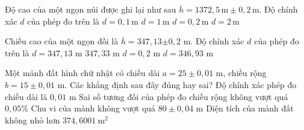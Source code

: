

\begin{ex}%
	Độ cao của một ngọn  núi được ghi lại như sau $\overline{h}=1372{,}5\,\text{m}\pm 0{,}2\,\text{m}$. Độ chính xác $ d$ của phép đo trên là
	\choice 
		{$ d=0{,}1\,\text{m}$} 
		{$ d=1\,\text{m}$} 
		 {\True $ d=0{,}2\,\text{m}$}
		 {$ d=2\,\text{m}$}
\end{ex}

\begin{ex}%
	Chiều cao của một ngọn đồi là $\overline{h}=347{,}13$$\pm 0,2$  m. Độ chính xác $ d$ của phép đo trên là
	\choice 
		{$ d=347{,}13$ m} 
		{$ 347{,}33$ m} 
		{\True $ d=0{,}2$  m}
		 {$ d=346{,}93$ m}
\end{ex}



\begin{ex}%
	Một mảnh đất hình chữ nhật có chiều dài $a= 25\pm 0{,}01$ m, chiều rộng $b= 15\pm  0{,}01$ m.
	Các khẳng định  sau đây đúng hay sai?
	\choiceTF 
		{\True Độ chính  xác phép đo chiều dài là $0{,}01$ m}
		{Sai số tương đối  của phép đo chiều rộng không vượt quá $0{,}05\%$}
		{\True Chu vi của mảnh không vượt quá $80\pm 0{,}04$ m} 
		{\True Diện tích của  mảnh đất không nhỏ hơn $374{,}6001~\mathrm{m^2}$}
\end{ex}

